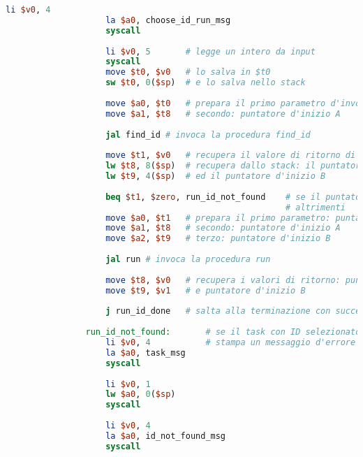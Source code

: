\begin{center}
\begin{lstlisting}[language=mips, gobble=14, stepnumber=1]
                    li $v0, 4
                    la $a0, choose_id_run_msg
                    syscall
                    
                    li $v0, 5		# legge un intero da input
                    syscall
                    move $t0, $v0	# lo salva in $t0
                    sw $t0, 0($sp)	# e lo salva nello stack
                    
                    move $a0, $t0	# prepara il primo parametro d'invocazione: ID inserito
                    move $a1, $t8	# secondo: puntatore d'inizio A
                    
                    jal find_id	# invoca la procedura find_id
                    
                    move $t1, $v0	# recupera il valore di ritorno di find_id
                    lw $t8, 8($sp)	# recupera dallo stack: il puntatore d'inizio A
                    lw $t9, 4($sp)	# ed il puntatore d'inizio B
                    
                    beq $t1, $zero, run_id_not_found	# se il puntatore restituito da find_id è nullo, allora non c'è nessun task con l'ID inserito
                										# altrimenti
                    move $a0, $t1	# prepara il primo parametro: puntatore al task con ID selezionato
                    move $a1, $t8	# secondo: puntatore d'inizio A
                    move $a2, $t9	# terzo: puntatore d'inizio B
                    
                    jal run	# invoca la procedura run
                    
                    move $t8, $v0   # recupera i valori di ritorno: puntatore d'inizio A
                    move $t9, $v1   # e puntatore d'inizio B
                    
                    j run_id_done   # salta alla terminazione con successo della procedura
                
                run_id_not_found:       # se il task con ID selezionato non è stato trovato
                    li $v0, 4           # stampa un messaggio d'errore
                    la $a0, task_msg
                    syscall
                    
                    li $v0, 1
                    lw $a0, 0($sp)
                    syscall
                    
                    li $v0, 4
                    la $a0, id_not_found_msg
                    syscall
                    

\end{lstlisting}
\end{center}

